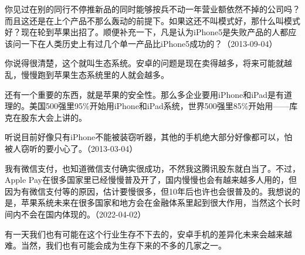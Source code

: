 
你见过在别的同行不停推新品的同时能够按兵不动一年营业额依然不掉的公司吗？而且这还是在上个产品不那么轰动的前提下。如果这还不叫模式好，那什么叫模式好？现在轮到苹果出招了。顺便补充一下，凡是认为iPhone5是失败产品的人都应该问一下在人类历史上有过几个单一产品比iPhone5成功的？（2013-09-04）


你说得很清楚，这个就叫生态系统。安卓的问题是现在卖得越多，将来可能就越乱，慢慢跑到苹果生态系统里的人就会越多。

还有一个重要的东西，就是苹果的安全性。那么多企业要用iPhone和iPad是有道理的。美国500强里95\%开始用iPhone和iPad系统，世界500强里85\%开始用——库克在股东大会上讲的。

听说目前好像只有iPhone不能被装窃听器，其他的手机绝大部分好像都可以，怕被人窃听的要小心了。（2013-03-04）


我有微信支付，也知道微信支付确实很成功，不然我这腾讯股东就白当了。不过，Apple Pay在很多国家里已经慢慢普及开了，国内慢慢也会有越来越多人用的，但因为有微信支付等的原因，估计要慢很多，但10年后也许也会很普及的。我想说的是，苹果系统未来在很多国家和地方会在金融体系里起到很大作用，当然这个长时间内不会在国内体现的。（2022-04-02）


有一天我们也有可能在这个行业生存不下去的，安卓手机的差异化未来会越来越难。当然，我们也有可能会成为生存下来的不多的几家之一。

